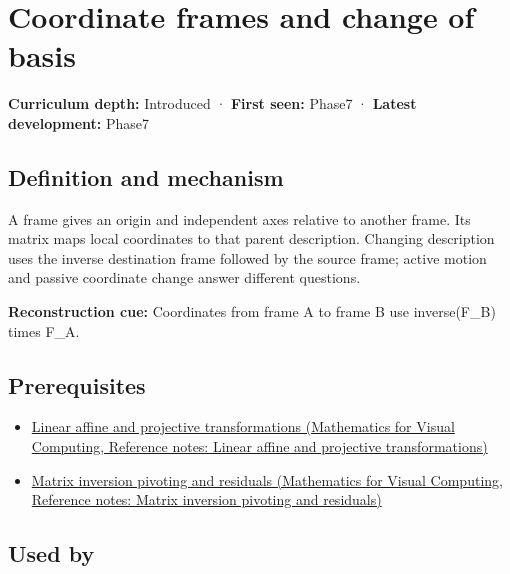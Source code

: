 \hypertarget{appendix-1bae9457dbc3}{}\label{referencestart:appendix-1bae9457dbc3}
\section{Coordinate frames and change of basis}\label{appendix-1bae9457dbc3-coordinate-frames-and-change-of-basis}

\textbf{Curriculum depth:} Introduced · \textbf{First seen:} Phase7 · \textbf{Latest development:} Phase7

\begin{allmightroledefinition}

\subsection{Definition and mechanism}\label{appendix-1bae9457dbc3-definition-and-mechanism}

A frame gives an origin and independent axes relative to another frame. Its matrix maps local coordinates to that parent description. Changing description uses the inverse destination frame followed by the source frame; active motion and passive coordinate change answer different questions.

\end{allmightroledefinition}

\textbf{Reconstruction cue:} Coordinates from frame A to frame B use inverse(F\_B) times F\_A.

\subsection{Prerequisites}\label{appendix-1bae9457dbc3-prerequisites}

\begin{itemize}
\tightlist
\item
  \href{../02-Mathematics-for-Visual-Computing/main.pdf\#nameddest=appendix-0bf0ca73f735}{Linear affine and projective transformations (Mathematics for Visual Computing, Reference notes: Linear affine and projective transformations)}
\item
  \href{../02-Mathematics-for-Visual-Computing/main.pdf\#nameddest=appendix-48d2e66378ab}{Matrix inversion pivoting and residuals (Mathematics for Visual Computing, Reference notes: Matrix inversion pivoting and residuals)}
\end{itemize}

\subsection{Used by}\label{appendix-1bae9457dbc3-used-by}

